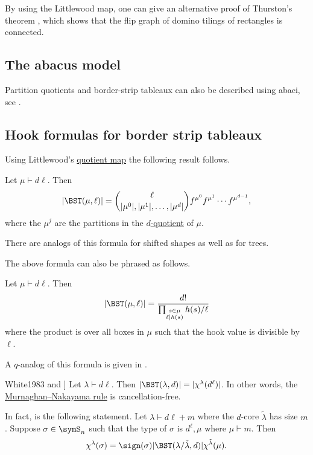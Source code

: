 By using the Littlewood map, one can give an alternative proof of Thurston's theorem \cite{Thurston1990},
which shows that the flip graph of domino tilings of rectangles is connected.


\subsection[borderStripAbacus]{The abacus model}

Partition quotients and border-strip tableaux can also be described using abaci,
see \cite{Wildon2018}.


\subsection[borderStripHookFormulas]{Hook formulas for border strip tableaux}

Using Littlewood's \hyperref[littlewoodMap]{quotient map} the following result follows.

\begin{theorem}
Let $\mu \vdash d\ell$. Then 
\[
|\BST(\mu,\ell)| = \binom{\ell}{|\mu^0|,|\mu^1|,\dotsc,|\mu^d|} f^{\mu^0} f^{\mu^1}\dotsm f^{\mu^{d-1}},
\]
where the $\mu^j$ are the partitions in the \hyperref[partitionQuotient]{$d$-quotient} of $\mu$.
\end{theorem}
There are analogs of this formula for shifted shapes as well as for trees.


The above formula can also be phrased as follows.
\begin{theorem}
Let $\mu \vdash d\ell$. Then 
\[
|\BST(\mu,\ell)| = \frac{d!}{\prod_{\substack{s \in \mu \\ \ell | h(s) } } h(s)/\ell }
\]
where the product is over all boxes in $\mu$ such that the hook value is divisible by $\ell$.
\end{theorem}
A $q$-analog of this formula is given in \cite{MendesLindbloomAirey2019}.



\begin{theorem}[See \cite[Corollary 9]{White1983} and \cite[Thm. 2.7.27]{JamesKerber1984}]
Let $\lambda \vdash d\ell$. Then 
$|\BST(\lambda,d)| = |\chi^{\lambda}(d^\ell)|$.
In other words, the \hyperref[schurMurnaghanNakayama]{Murnaghan--Nakayama rule} is cancellation-free.

In fact, \cite[Thm. 2.7.27]{JamesKerber1984} is the following statement.
Let $\lambda \vdash d\ell + m$ where the $d$-core $\widetilde{\lambda}$ has size $m$.
Suppose $\sigma \in \symS_n$ such that the type of $\sigma$ is $d^\ell,\mu$ where $\mu \vdash m$.
Then
\[
\chi^{\lambda}(\sigma) = \sign(\sigma) |\BST(\lambda/\tilde{\lambda},d)| \chi^{\tilde{\lambda}}(\mu) .
\]
\end{theorem}
